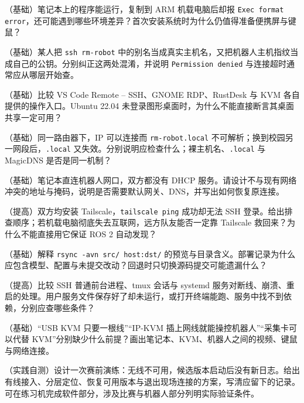 \begin{problemset}
  \item\label{prob:v1-deploy-1} （基础）笔记本上的程序能运行，复制到 ARM 机载电脑后却报 \texttt{Exec format error}，还可能遇到哪些环境差异？首次安装系统时为什么仍值得准备便携屏与键鼠？
  \item\label{prob:v1-deploy-2} （基础）某人把 \texttt{ssh rm-robot} 中的别名当成真实主机名，又把机器人主机指纹当成自己的公钥。分别纠正这两处混淆，并说明 \texttt{Permission denied} 与连接超时通常应从哪层开始查。
  \item\label{prob:v1-deploy-3} （基础）比较 VS Code Remote -- SSH、GNOME RDP、RustDesk 与 KVM 各自提供的操作入口。Ubuntu 22.04 未登录图形桌面时，为什么不能直接断言其桌面共享一定可用？
  \item\label{prob:v1-deploy-4} （基础）同一路由器下，IP 可以连接而 \texttt{rm-robot.local} 不可解析；换到校园另一网段后，\texttt{.local} 又失效。分别说明应检查什么；裸主机名、\texttt{.local} 与 MagicDNS 是否是同一机制？
  \item\label{prob:v1-deploy-5} （基础）笔记本直连机器人网口，双方都没有 DHCP 服务。请设计不与现有网络冲突的地址与掩码，说明是否需要默认网关、DNS，并写出如何恢复原连接。
  \item\label{prob:v1-deploy-6} （提高）双方均安装 Tailscale，\texttt{tailscale ping} 成功却无法 SSH 登录。给出排查顺序；若机载电脑彻底失去互联网，远方队友能否一定靠 Tailscale 救回来？为什么不能直接用它保证 ROS 2 自动发现？
  \item\label{prob:v1-deploy-7} （基础）解释 \texttt{rsync -avn src/ host:dst/} 的预览与目录含义。部署记录为什么应包含模型、配置与未提交改动？回退时只切换源码提交可能遗漏什么？
  \item\label{prob:v1-deploy-8} （提高）比较 SSH 普通前台进程、tmux 会话与 systemd 服务对断线、崩溃、重启的处理。用户服务文件保存好了却未运行，或打开终端能跑、服务中找不到依赖，分别应查哪些条件？
  \item\label{prob:v1-deploy-9} （基础）“USB KVM 只要一根线”“IP-KVM 插上网线就能操控机器人”“采集卡可以代替 KVM”分别缺少什么前提？画出笔记本、KVM、机器人之间的视频、键鼠与网络连接。
  \item\label{prob:v1-deploy-10} （实践自测）设计一次赛前演练：无线不可用，候选版本启动后没有新日志。给出有线接入、分层定位、恢复可用版本与退出现场连接的方案，写清应留下的记录。可在练习机完成软件部分，涉及比赛与机器人部分列明实际验证条件。
\end{problemset}

